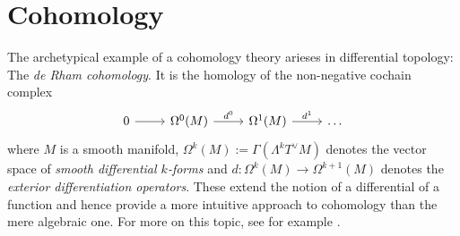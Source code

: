 \chapter{Cohomology}

The archetypical example of a cohomology theory arieses in differential topology: The \emph{de Rham cohomology}. It is the homology of the non-negative cochain complex 
\begin{equation*}
	\begin{tikzcd}
		0 \arrow[r] & \Omega^0(M) \arrow[r,"d^0"] & \Omega^1(M) \arrow[r,"d^1"] & \dots
	\end{tikzcd}
\end{equation*}
\noindent where $M$ is a smooth manifold, $\Omega^k(M) := \Gamma(\Lambda^k T^\vee M)$ denotes the vector space of \emph{smooth differential $k$-forms} and $d : \Omega^k(M) \to \Omega^{k + 1}(M)$ denotes the \emph{exterior differentiation operators}. These extend the notion of a differential of a function and hence provide a more intuitive approach to cohomology than the mere algebraic one. For more on this topic, see for example \cite{lee:smooth_manifolds:2013}. 
